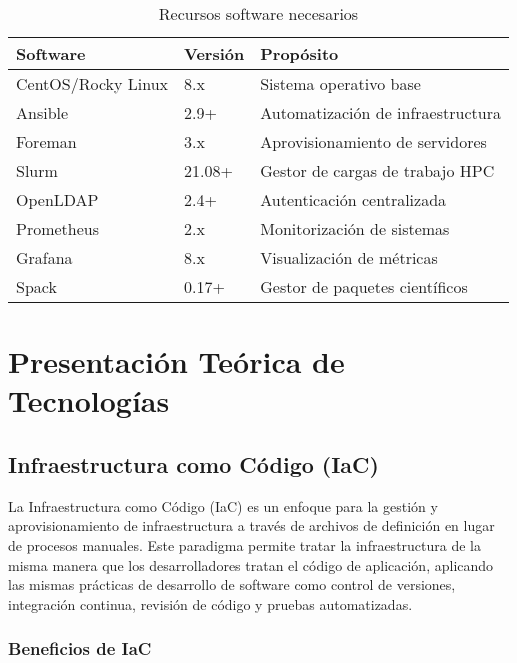 \documentclass[12pt,a4paper]{report}
\begin{document}
\begin{table}[H]
\centering
\begin{tabular}{|l|l|l|}
\hline
\textbf{Software} & \textbf{Versión} & \textbf{Propósito} \\
\hline
CentOS/Rocky Linux & 8.x & Sistema operativo base \\
\hline
Ansible & 2.9+ & Automatización de infraestructura \\
\hline
Foreman & 3.x & Aprovisionamiento de servidores \\
\hline
Slurm & 21.08+ & Gestor de cargas de trabajo HPC \\
\hline
OpenLDAP & 2.4+ & Autenticación centralizada \\
\hline
Prometheus & 2.x & Monitorización de sistemas \\
\hline
Grafana & 8.x & Visualización de métricas \\
\hline
Spack & 0.17+ & Gestor de paquetes científicos \\
\hline
\end{tabular}
\caption{Recursos software necesarios}
\label{tab:software}
\end{table}

\chapter{Presentación Teórica de Tecnologías}

\section{Infraestructura como Código (IaC)}

La Infraestructura como Código (IaC) es un enfoque para la gestión y aprovisionamiento de infraestructura a través de archivos de definición en lugar de procesos manuales. Este paradigma permite tratar la infraestructura de la misma manera que los desarrolladores tratan el código de aplicación, aplicando las mismas prácticas de desarrollo de software como control de versiones, integración continua, revisión de código y pruebas automatizadas.

\subsection{Beneficios de IaC}
\end{document}
